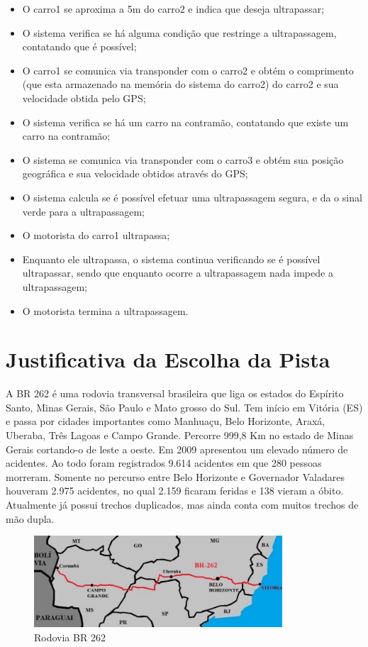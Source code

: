 \begin{itemize}
	\item O carro1 se aproxima a 5m do carro2 e indica que deseja ultrapassar;
	\item O sistema verifica se há alguma condição que restringe a ultrapassagem, contatando que é possível;
	\item O carro1 se comunica via transponder com o carro2 e obtém o comprimento (que esta armazenado na memória do sistema do carro2) do carro2 e sua velocidade obtida pelo GPS;
	\item O sistema verifica se há um carro na contramão, contatando que existe um carro na contramão;
	\item O sistema se comunica via transponder com o carro3 e obtém sua posição geográfica e sua velocidade obtidos através do GPS;
	\item O sistema calcula se é possível efetuar uma ultrapassagem segura, e da o sinal verde para a ultrapassagem;
	\item O motorista do carro1 ultrapassa;
	\item Enquanto ele ultrapassa, o sistema continua verificando se é possível ultrapassar, sendo que enquanto ocorre a ultrapassagem nada impede a ultrapassagem;
	\item O motorista termina a ultrapassagem.
\end{itemize}

\section{Justificativa da Escolha da Pista}

A BR 262 é uma rodovia transversal brasileira que liga os estados do Espírito Santo, Minas Gerais, São Paulo e Mato grosso do Sul. Tem início em Vitória (ES) e passa por cidades importantes como Manhuaçu, Belo Horizonte, Araxá, Uberaba, Três Lagoas e Campo Grande. Percorre 999,8 Km no estado de Minas Gerais cortando-o de leste a oeste. Em 2009 apresentou um elevado número de acidentes. Ao todo foram registrados 9.614 acidentes em que 280 pessoas morreram. Somente no percurso entre Belo Horizonte e Governador Valadares houveram 2.975 acidentes, no qual 2.159 ficaram feridas e 138 vieram a óbito. Atualmente já possui trechos duplicados, mas ainda conta com muitos trechos de mão dupla. 

\begin{figure}[h!]
  \centering
  \includegraphics[width=350px, scale=1]{figuras/mapa}
  \caption{Rodovia BR 262}
\label{fig:mapa}
\end{figure}

